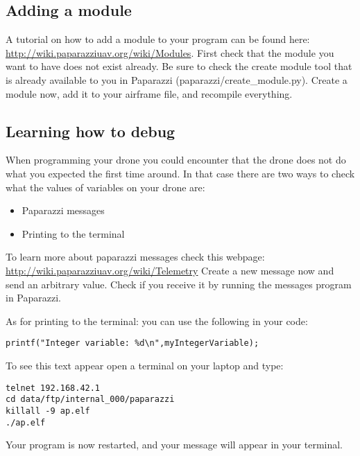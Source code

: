 \documentclass{article}
\begin{document}
\subsection*{Adding a module}
A tutorial on how to add a module to your program can be found here: \url{http://wiki.paparazziuav.org/wiki/Modules}.
First check that the module you want to have does not exist already. Be sure to check the create module tool that is already available to you in Paparazzi (paparazzi/create\_module.py). 
Create a module now, add it to your airframe file, and recompile everything. 

\subsection*{Learning how to debug}
When programming your drone you could encounter that the drone does not do what you expected the first time around. In that case there are two ways to check what the values of variables on your drone are:
\begin{itemize}
	\item Paparazzi messages
	\item Printing to the terminal
\end{itemize}
To learn more about paparazzi messages check this webpage: \url{http://wiki.paparazziuav.org/wiki/Telemetry}
Create a new message now and send an arbitrary value. Check if you receive it by running the messages program in Paparazzi. 

As for printing to the terminal: you can use the following in your code:

\begin{verbatim}
printf("Integer variable: %d\n",myIntegerVariable);
\end{verbatim}
To see this text appear open a terminal on your laptop and type:
\begin{verbatim}
telnet 192.168.42.1
cd data/ftp/internal_000/paparazzi
killall -9 ap.elf 
./ap.elf
\end{verbatim}
Your program is now restarted, and your message will appear in your terminal. 
\end{document}
